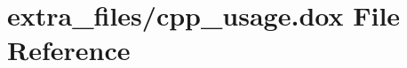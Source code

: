 \hypertarget{cpp__usage_8dox}{}\section{extra\+\_\+files/cpp\+\_\+usage.dox File Reference}
\label{cpp__usage_8dox}
